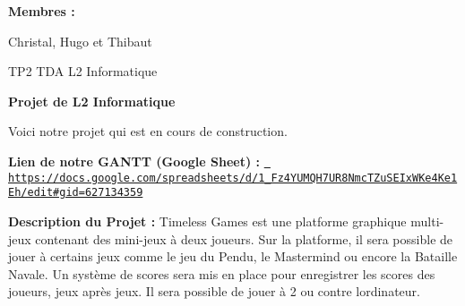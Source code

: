 \label{index_md__info_etu_l2info_s200470_Timeless_Games_README}%
%
 {\bfseries{Membres \+:}}

Christal, Hugo et Thibaut

TP2 TDA L2 Informatique

{\bfseries{Projet de L2 Informatique}}

Voici notre projet qui est en cours de construction.

{\bfseries{Lien de notre GANTT (Google Sheet) \+:}} \href{https://docs.google.com/spreadsheets/d/1_Fz4YUMQH7UR8NmcTZuSEIxWKe4Ke1Eh/edit\#gid=627134359}{\texttt{ https\+://docs.\+google.\+com/spreadsheets/d/1\+\_\+\+Fz4\+YUMQH7\+UR8\+Nmc\+TZu\+SEIx\+WKe4\+Ke1\+Eh/edit\#gid=627134359}}

{\bfseries{Description du Projet \+:}} Timeless Games est une platforme graphique multi-\/jeux contenant des mini-\/jeux à deux joueurs. Sur la platforme, il sera possible de jouer à certains jeux comme le jeu du Pendu, le Mastermind ou encore la Bataille Navale. Un système de scores sera mis en place pour enregistrer les scores des joueurs, jeux après jeux. Il sera possible de jouer à 2 ou contre l\textquotesingle{}ordinateur. 
